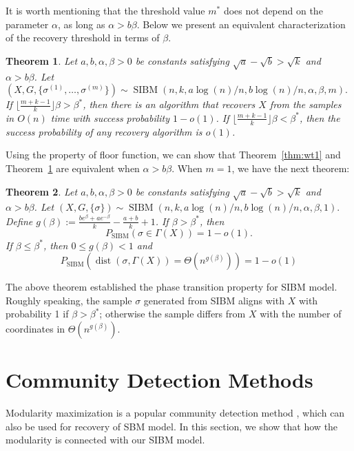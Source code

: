 \label{key}\documentclass[conference]{IEEEtran}
\newtheorem{theorem}{Theorem}%
\DeclareMathOperator{\SIBM}{SIBM}
\DeclareMathOperator{\dist}{dist}
\begin{document}
It is worth mentioning that the threshold value $m^\ast$ does not depend on the parameter $\alpha$, as long as $\alpha>b\beta$.
Below we present an equivalent characterization of the recovery threshold in terms of $\beta$.
\begin{theorem} \label{thm:wt2}
	Let $a,b,\alpha,\beta> 0$ be constants satisfying $\sqrt{a}-\sqrt{b} > \sqrt{k}$ and $\alpha>b\beta$. 
	Let 
	$
	(X,G,\{\sigma^{(1)},\dots,\sigma^{(m)}\}) \sim \SIBM(n, k, a\log(n)/n, b\log(n)/n,\alpha,\beta,m).
	$
	If $\lfloor \frac{m+k-1}{k} \rfloor \beta>\beta^\ast$,
	then there is an algorithm that recovers $X$ from the samples in $O(n)$ time with success probability $1-o(1)$.
	If $\lfloor \frac{m+k-1}{k} \rfloor \beta <\beta^\ast$, then the success probability of any recovery algorithm is $o(1)$. 
\end{theorem}
Using the property of floor function, we can show that Theorem~\ref{thm:wt1} and Theorem~\ref{thm:wt2} are equivalent when $\alpha > b \beta$.
When $m=1$, we have the next theorem:

\begin{theorem}  \label{thm:wt3}
Let $a,b,\alpha,\beta> 0$ be constants satisfying $\sqrt{a}-\sqrt{b} > \sqrt{k}$ and $\alpha>b\beta$.
Let 
$
(X,G,\{\sigma\}) \sim \SIBM(n,k, a\log(n)/n, b\log(n)/n,\alpha,\beta,1).
$
Define $g(\beta)  := \frac{b e^{\beta}+a e^{-\beta}}{k}-\frac{a+b}{k}+1$.
If $\beta>\beta^\ast$, then
$$
P_{\SIBM}(\sigma \in \Gamma(X)) = 1-o(1).
$$
If $\beta\le \beta^\ast$, then $0\leq g(\beta) < 1$ and
$$
P_{\SIBM}(\dist(\sigma, \Gamma(X))= \Theta(n^{g(\beta)})) = 1-o(1)
$$
\end{theorem}

The above theorem established the phase transition property for SIBM model.
Roughly speaking, the sample $\sigma$ generated from SIBM aligns with $X$ with probability 1 if $\beta > \beta^*$;
otherwise the sample differs from $X$ with the number of coordinates in $\Theta(n^{g(\beta)})$.
\section{Community Detection Methods}\label{s:cdm}
Modularity maximization is a popular community detection method \cite{clauset2004finding}, which can also be used for recovery of SBM model.
In this section,
we show that how the modularity is connected with our SIBM model.
\end{document}
